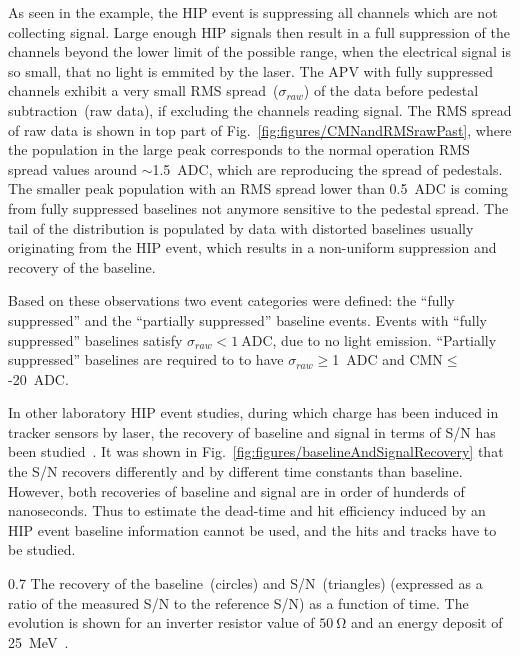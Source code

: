 As seen in the example, the HIP event is suppressing all channels which are not collecting signal. Large enough HIP signals then result in a full suppression of the channels beyond the lower limit of the possible range, when the electrical signal is so small, that no light is emmited by the laser. The APV with fully suppressed channels exhibit a very small RMS spread~($\sigma_{raw}$) of the data before pedestal subtraction~(raw data), if excluding the channels reading signal. The RMS spread of raw data is shown in top part of Fig.~\ref{fig:figures/CMNandRMSrawPast}, where the population in the large peak corresponds to the normal operation RMS spread values around $\sim$1.5~ADC, which are reproducing the spread of pedestals. The smaller peak population with an RMS spread lower than 0.5~ADC is coming from fully suppressed baselines not anymore sensitive to the pedestal spread. The tail of the distribution is populated by data with distorted baselines usually originating from the HIP event, which results in a non-uniform suppression and recovery of the baseline.

Based on these observations two event categories were defined: the ``fully suppressed'' and the ``partially suppressed'' baseline events. Events with ``fully suppressed'' baselines satisfy $\sigma_{raw}< 1~\mathrm{ADC}$, due to no light emission. ``Partially suppressed'' baselines are required to to have $\sigma_{raw}\geq$1~ADC and CMN$\leq$-20~ADC.

In other laboratory HIP event studies, during which charge has been induced in tracker sensors by laser, the recovery of baseline and signal in terms of S/N has been studied~\cite{Adam:2005pz}. It was shown in Fig.~\ref{fig:figures/baselineAndSignalRecovery} that the S/N recovers differently and by different time constants than baseline. However, both recoveries of baseline and signal are in order of hunderds of nanoseconds. Thus to estimate the dead-time and hit efficiency induced by an HIP event baseline information cannot be used, and the hits and tracks have to be studied.

                 {0.7}       %
                 {The recovery of the baseline~(circles) and S/N~(triangles) (expressed as a ratio of the measured S/N to the reference S/N) as a function of time. The evolution is shown for an inverter resistor value of $50~\mathrm{\Omega}$ and an energy deposit of 25~MeV~\cite{Adam:2005pz}.} %

